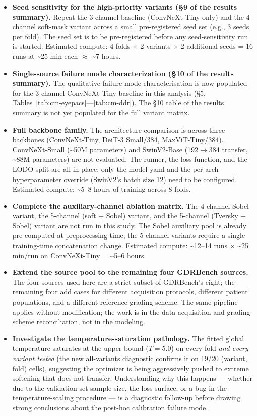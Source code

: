 \documentclass[11pt]{article}
\begin{document}
\begin{itemize}[leftmargin=*, topsep=0pt]
  \item \textbf{Seed sensitivity for the high-priority variants (§9 of the results summary).} Repeat the 3-channel baseline (ConvNeXt-Tiny only) and the 4-channel soft-mask variant across a small pre-registered seed set (e.g., 3 seeds per fold). The seed set is to be pre-registered before any seed-sensitivity run is started. Estimated compute: 4 folds $\times$ 2 variants $\times$ 2 additional seeds = 16 runs at \textasciitilde{}25 min each $\approx$ \textasciitilde{}7 hours.
  \item \textbf{Single-source failure mode characterization (§10 of the results summary).} The qualitative failure-mode characterisation is now populated for the 3-channel ConvNeXt-Tiny baseline in this analysis (§5, Tables~\ref{tab:cm-eyepacs}---\ref{tab:cm-ddr}). The §10 table of the results summary is not yet populated for the full variant matrix.
  \item \textbf{Full backbone family.} The architecture comparison is across three backbones (ConvNeXt-Tiny, DeiT-3 Small/384, MaxViT-Tiny/384). ConvNeXt-Small (\textasciitilde{}50M parameters) and SwinV2-Base (192$\to$384 transfer, \textasciitilde{}88M parameters) are not evaluated. The runner, the loss function, and the LODO split are all in place; only the model yaml and the per-arch hyperparameter override (SwinV2's batch size 12) need to be configured. Estimated compute: \textasciitilde{}5--8 hours of training across 8 folds.
  \item \textbf{Complete the auxiliary-channel ablation matrix.} The 4-channel Sobel variant, the 5-channel (soft + Sobel) variant, and the 5-channel (Tversky + Sobel) variant are not run in this study. The Sobel auxiliary pool is already pre-computed at preprocessing time; the 5-channel variants require a single training-time concatenation change. Estimated compute: \textasciitilde{}12--14 runs $\times$ \textasciitilde{}25 min/run on ConvNeXt-Tiny = \textasciitilde{}5--6 hours.
  \item \textbf{Extend the source pool to the remaining four GDRBench sources.} The four sources used here are a strict subset of GDRBench's eight; the remaining four add cases for different acquisition protocols, different patient populations, and a different reference-grading scheme. The same pipeline applies without modification; the work is in the data acquisition and grading-scheme reconciliation, not in the modeling.
  \item \textbf{Investigate the temperature-saturation pathology.} The fitted global temperature saturates at the upper bound ($T = 5.0$) on every fold \emph{and every variant tested} (the new all-variants diagnostic confirms it on 19/20 (variant, fold) cells), suggesting the optimizer is being aggressively pushed to extreme softening that does not transfer. Understanding why this happens --- whether due to the validation-set sample size, the loss surface, or a bug in the temperature-scaling procedure --- is a diagnostic follow-up before drawing strong conclusions about the post-hoc calibration failure mode.
\end{itemize}
\end{document}

